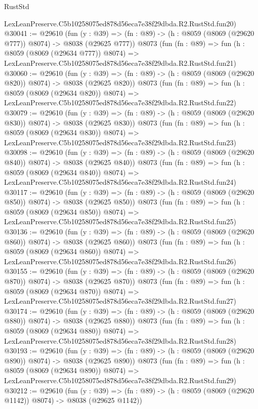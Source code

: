 \begin{lexlean}{RustStd}
\begin{coremodule}
    LexLeanPreserve.C5b10258075ed878d56eca7e38f29dbda.R2.RustStd.fun20)
@30041 := @29610
    (fun (y : @39) => (fn : @89) -> (h : @8059 (@8069 (@29620 @777)) @8074) -> @8038 (@29625 @777))
    @8073
    (fun (fn : @89) =>
    fun (h : @8059 (@8069 (@29634 @777)) @8074) =>
    LexLeanPreserve.C5b10258075ed878d56eca7e38f29dbda.R2.RustStd.fun21)
@30060 := @29610
    (fun (y : @39) => (fn : @89) -> (h : @8059 (@8069 (@29620 @820)) @8074) -> @8038 (@29625 @820))
    @8073
    (fun (fn : @89) =>
    fun (h : @8059 (@8069 (@29634 @820)) @8074) =>
    LexLeanPreserve.C5b10258075ed878d56eca7e38f29dbda.R2.RustStd.fun22)
@30079 := @29610
    (fun (y : @39) => (fn : @89) -> (h : @8059 (@8069 (@29620 @830)) @8074) -> @8038 (@29625 @830))
    @8073
    (fun (fn : @89) =>
    fun (h : @8059 (@8069 (@29634 @830)) @8074) =>
    LexLeanPreserve.C5b10258075ed878d56eca7e38f29dbda.R2.RustStd.fun23)
@30098 := @29610
    (fun (y : @39) => (fn : @89) -> (h : @8059 (@8069 (@29620 @840)) @8074) -> @8038 (@29625 @840))
    @8073
    (fun (fn : @89) =>
    fun (h : @8059 (@8069 (@29634 @840)) @8074) =>
    LexLeanPreserve.C5b10258075ed878d56eca7e38f29dbda.R2.RustStd.fun24)
@30117 := @29610
    (fun (y : @39) => (fn : @89) -> (h : @8059 (@8069 (@29620 @850)) @8074) -> @8038 (@29625 @850))
    @8073
    (fun (fn : @89) =>
    fun (h : @8059 (@8069 (@29634 @850)) @8074) =>
    LexLeanPreserve.C5b10258075ed878d56eca7e38f29dbda.R2.RustStd.fun25)
@30136 := @29610
    (fun (y : @39) => (fn : @89) -> (h : @8059 (@8069 (@29620 @860)) @8074) -> @8038 (@29625 @860))
    @8073
    (fun (fn : @89) =>
    fun (h : @8059 (@8069 (@29634 @860)) @8074) =>
    LexLeanPreserve.C5b10258075ed878d56eca7e38f29dbda.R2.RustStd.fun26)
@30155 := @29610
    (fun (y : @39) => (fn : @89) -> (h : @8059 (@8069 (@29620 @870)) @8074) -> @8038 (@29625 @870))
    @8073
    (fun (fn : @89) =>
    fun (h : @8059 (@8069 (@29634 @870)) @8074) =>
    LexLeanPreserve.C5b10258075ed878d56eca7e38f29dbda.R2.RustStd.fun27)
@30174 := @29610
    (fun (y : @39) => (fn : @89) -> (h : @8059 (@8069 (@29620 @880)) @8074) -> @8038 (@29625 @880))
    @8073
    (fun (fn : @89) =>
    fun (h : @8059 (@8069 (@29634 @880)) @8074) =>
    LexLeanPreserve.C5b10258075ed878d56eca7e38f29dbda.R2.RustStd.fun28)
@30193 := @29610
    (fun (y : @39) => (fn : @89) -> (h : @8059 (@8069 (@29620 @890)) @8074) -> @8038 (@29625 @890))
    @8073
    (fun (fn : @89) =>
    fun (h : @8059 (@8069 (@29634 @890)) @8074) =>
    LexLeanPreserve.C5b10258075ed878d56eca7e38f29dbda.R2.RustStd.fun29)
@30212 := @29610
    (fun (y : @39) =>
    (fn : @89) -> (h : @8059 (@8069 (@29620 @1142)) @8074) -> @8038 (@29625 @1142))

\end{coremodule}
\end{lexlean}
